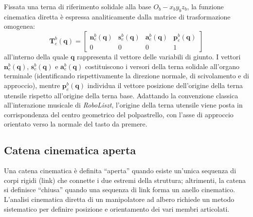 Fissata una terna di riferimento solidale alla base $O_b-x_b y_b z_b$, la funzione cinematica diretta è espressa analiticamente dalla matrice di trasformazione omogenea:
\begin{equation}
    \boldsymbol{T}_e^b(\boldsymbol{q}) = 
    \begin{bmatrix} 
        \boldsymbol{n}_e^b(\boldsymbol{q}) & \boldsymbol{s}_e^b(\boldsymbol{q}) & \boldsymbol{a}_e^b(\boldsymbol{q}) & \boldsymbol{p}_e^b(\boldsymbol{q}) \\ 
        0 & 0 & 0 & 1 
    \end{bmatrix}
    \label{eq:forward_kinematics_matrix}
\end{equation}
all'interno della quale $\boldsymbol{q}$ rappresenta il vettore delle variabili di giunto. 
I vettori $\boldsymbol{n}_e^b(\boldsymbol{q})$, $\boldsymbol{s}_e^b(\boldsymbol{q})$ e $\boldsymbol{a}_e^b(\boldsymbol{q})$ costituiscono i versori della terna solidale all'organo terminale (identificando rispettivamente la direzione normale, di scivolamento e di approccio), mentre $\boldsymbol{p}_e^b(\boldsymbol{q})$ individua il vettore posizione dell'origine della terna utensile rispetto all'origine della terna base.
Adattando la convenzione classica all'interazione musicale di \textit{RoboLiszt}, l'origine della terna utensile viene posta in corrispondenza del centro geometrico del polpastrello, con l'asse di approccio orientato verso la normale del tasto da premere.

\subsection{Catena cinematica aperta}

Una catena cinematica è definita “aperta” quando esiste un'unica sequenza di corpi rigidi (link) che connette i due estremi della struttura; altrimenti, la catena si definisce “chiusa” quando una sequenza di link forma un anello cinematico.
L'analisi cinematica diretta di un manipolatore ad albero richiede un metodo sistematico per definire posizione e orientamento dei vari membri articolati. 

